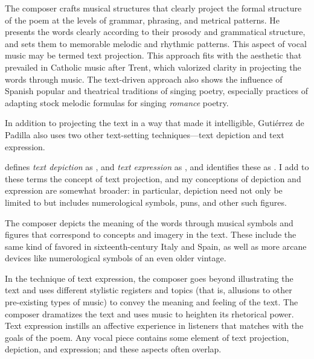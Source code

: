 The composer crafts musical structures that clearly project the formal structure
of the poem at the levels of grammar, phrasing, and metrical patterns.
He presents the words clearly according to their prosody and grammatical
structure, and sets them to memorable melodic and rhythmic patterns.
This aspect of vocal music may be termed text projection.
This approach fits with the aesthetic that prevailed in Catholic music after
Trent, which valorized clarity in projecting the words through music.
The text-driven approach also shows the influence of Spanish popular and
theatrical traditions of singing poetry, especially practices of adapting stock
melodic formulas for singing \emph{romance} poetry.

In addition to projecting the text in a way that made it intelligible, Gutiérrez
de Padilla also uses two other text-setting techniques---text depiction and text
expression.%
\begin{Footnote}
    \Autocite[207]{Burkholder:History} defines \emph{text depiction} as
    , and
    \emph{text expression} as , and identifies these as .
    I add to these terms the concept of text projection, and my conceptions of
    depiction and expression are somewhat broader: in particular, depiction need
    not only be limited to  but includes numerological
    symbols, puns, and other such figures.
\end{Footnote}
The composer depicts the meaning of the words through musical symbols and
figures that correspond to concepts and imagery in the text.
These include the same kind of  favored in
sixteenth-century Italy and Spain, as well as more arcane devices like
numerological symbols of an even older vintage.

In the technique of text expression, the composer goes beyond illustrating the
text and uses different stylistic registers and topics (that is, allusions to
other pre-existing types of music) to convey the meaning and feeling of the
text.
The composer dramatizes the text and uses music to heighten its rhetorical
power.
Text expression instills an affective experience in listeners that matches with
the goals of the poem.
Any vocal piece contains some element of text projection, depiction, and
expression; and these aspects often overlap.

